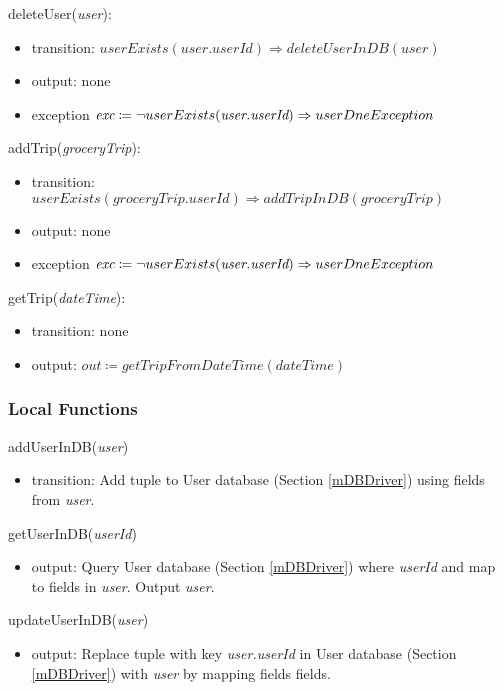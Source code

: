 \documentclass[12pt, titlepage]{article}
\begin{document}
\noindent deleteUser(\textit{user}):
\begin{itemize}
\item transition: \( userExists(\textit{user.userId}) \Rightarrow deleteUserInDB(\textit{user})\) 
\item output: none
\item exception \( \textit{exc} \coloneqq \neg userExists(\textit{user.userId}) \Rightarrow \\ userDneException\)
\end{itemize}

\noindent addTrip(\textit{groceryTrip}):
\begin{itemize}
\item transition: \( userExists(\textit{groceryTrip.userId}) \Rightarrow addTripInDB(\textit{groceryTrip})\) 
\item output: none
\item exception \( \textit{exc} \coloneqq \neg userExists(\textit{user.userId}) \Rightarrow \\ userDneException\)
\end{itemize}

\noindent getTrip(\textit{dateTime}):
\begin{itemize}
\item transition: none
\item output: \( \textit{out} \coloneqq getTripFromDateTime(\textit{dateTime}) \)
\end{itemize}

\subsubsection{Local Functions}
addUserInDB(\textit{user})
\begin{itemize}
\item transition: Add tuple to User database (Section \ref{mDBDriver}) using fields from \textit{user}.
\end{itemize}

\noindent getUserInDB(\textit{userId})
\begin{itemize}
\item output:  Query User database (Section \ref{mDBDriver}) where \textit{userId} and map to fields in \textit{user}. Output \textit{user}.
\end{itemize}

\noindent updateUserInDB(\textit{user})
\begin{itemize}
\item output:  Replace tuple with key \textit{user.userId} in User database (Section \ref{mDBDriver}) with \textit{user} by mapping fields fields.
\end{itemize}
\end{document}
